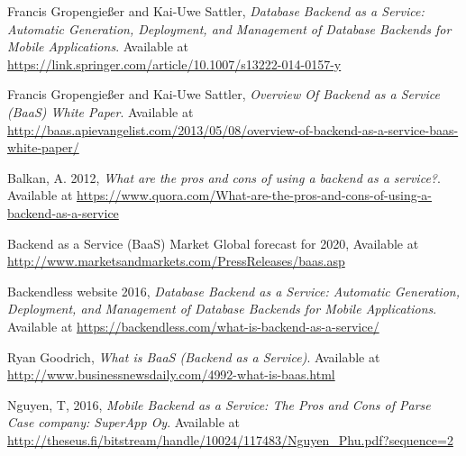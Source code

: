 \documentclass[a4paper]{article}
\begin{document}
    \begin{thebibliography}{9}
    	Francis Gropengießer and Kai-Uwe Sattler,
      \emph{Database Backend as a Service: Automatic Generation, Deployment, and Management of Database Backends for Mobile Applications}.
			Available at \url{https://link.springer.com/article/10.1007/s13222-014-0157-y}
			
    	Francis Gropengießer and Kai-Uwe Sattler,
      \emph{Overview Of Backend as a Service (BaaS) White Paper}.
			Available at \url{http://baas.apievangelist.com/2013/05/08/overview-of-backend-as-a-service-baas-white-paper/}
			
						
		
			Balkan, A. 2012,
      \emph{What are the pros and cons of using a backend as a service?}.
			Available at \url{https://www.quora.com/What-are-the-pros-and-cons-of-using-a-backend-as-a-service}			
		
			Backend as a Service (BaaS) Market Global forecast for 2020,
			Available at \url{http://www.marketsandmarkets.com/PressReleases/baas.asp}		
		
			Backendless website 2016,
      \emph{Database Backend as a Service: Automatic Generation, Deployment, and Management of Database Backends for Mobile Applications}.
			Available at \url{https://backendless.com/what-is-backend-as-a-service/}
	

			Ryan Goodrich,
      \emph{What is BaaS (Backend as a Service)}.
			Available at \url{http://www.businessnewsdaily.com/4992-what-is-baas.html}	
			
			Nguyen, T, 2016,
      \emph{Mobile Backend as a Service: The Pros and Cons of Parse
			Case company: SuperApp Oy}.
			Available at \url{http://theseus.fi/bitstream/handle/10024/117483/Nguyen_Phu.pdf?sequence=2}	
		
		
		\end{thebibliography}
    
\end{document}
